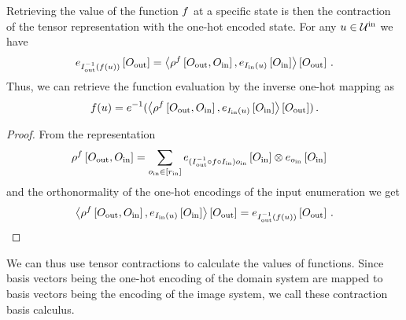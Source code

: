 \begin{theorem}\label{the:basisCalculus}
	Retrieving the value of the function $f$ at a specific state is then the contraction of the tensor representation with the one-hot encoded state.
	For any $u\in\mathcal{U}^{\mathrm{in}}$ we have
	\begin{align*}
		e_{I_{\mathrm{out}}^{-1}(f(u))}\left[O_{\mathrm{out}}\right]
		= \left\langle 
			\rho^{f}\left[O_{\mathrm{out}},O_{\mathrm{in}}\right],
			e_{I_{\mathrm{in}}(u)}\left[O_{\mathrm{in}}\right]
		\right\rangle \left[ O_{\mathrm{out}} \right] \, .
	\end{align*}
	Thus, we can retrieve the function evaluation by the inverse one-hot mapping as
	\begin{align*}
		f(u) = e^{-1}(\left\langle 
			\rho^{f}\left[O_{\mathrm{out}},O_{\mathrm{in}}\right],
			e_{I_{\mathrm{in}}(u)}\left[O_{\mathrm{in}}\right]
		\right\rangle \left[ O_{\mathrm{out}} \right]) \, .
\end{align*}
\end{theorem}
\begin{proof}
	From the representation
	\begin{align*}
		\rho^{f}\left[O_{\mathrm{out}},O_{\mathrm{in}}\right]
		& =  \sum_{o_{\mathrm{in}}\in[r_{\mathrm{in}}]}
			e_{(I_{\mathrm{out}}^{-1} \circ f \circ I_{\mathrm{in}}) o_{\mathrm{in}}
				}\left[O_{\mathrm{in}}\right]
			\otimes
			e_{o_{\mathrm{in}}}\left[O_{\mathrm{in}}\right]
	\end{align*}
	and the orthonormality of the one-hot encodings of the input enumeration we get
	\begin{align*}
		 \left\langle 
			\rho^{f}\left[O_{\mathrm{out}},O_{\mathrm{in}}\right],
			e_{I_{\mathrm{in}}(u)}\left[O_{\mathrm{in}}\right]
		\right\rangle \left[ O_{\mathrm{out}} \right]
		= e_{I_{\mathrm{out}}^{-1}(f(u))}\left[O_{\mathrm{out}}\right] \, .
	\end{align*}
\end{proof}

We can thus use tensor contractions to calculate the values of functions.
Since basis vectors being the one-hot encoding of the domain system are mapped to basis vectors being the encoding of the image system, we call these contraction basis calculus.



